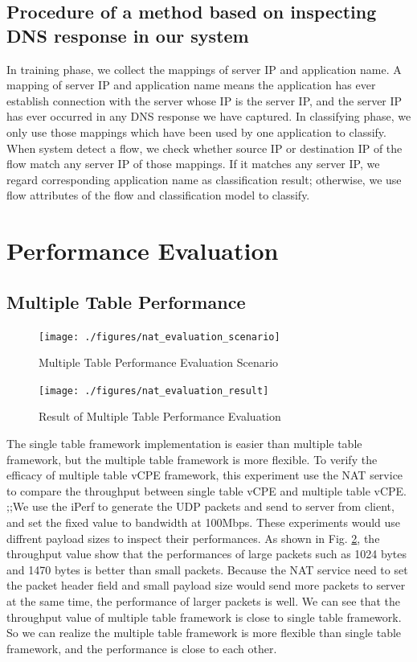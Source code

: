 \documentclass[journal]{IEEEtran}
\begin{document}
\subsection{Procedure of a method based on inspecting DNS response in our system}
In training phase, we collect the mappings of server IP and application name. A mapping of server IP and application name means the application has ever establish connection with the server whose IP is the server IP, and the server IP has ever occurred in any DNS response we have captured.
In classifying phase, we only use those mappings which have been used by one application to classify. When system detect a flow, we check whether source IP or destination IP of the flow match any server IP of those mappings. If it matches any server IP, we regard corresponding application name as classification result; otherwise, we use flow attributes of the flow and classification model to classify.



\section{Performance Evaluation}
\subsection{Multiple Table Performance}

\begin{figure}[!t]
\centering
\texttt{[image: ./figures/nat\_evaluation\_scenario]}
\caption{Multiple Table Performance Evaluation Scenario}
\label{fig:nat_evaluation}
\end{figure}

\begin{figure}[!t]
\centering
\texttt{[image: ./figures/nat\_evaluation\_result]}
\caption{Result of Multiple Table Performance Evaluation}
\label{fig:nat_evaluation_result}
\end{figure}

The single table framework implementation is easier than multiple table framework, but the multiple table framework is more flexible. To verify the efficacy of multiple table vCPE framework, this experiment use the NAT service to compare the throughput between single table vCPE and multiple table vCPE.
;;We use the iPerf  to generate the UDP packets and send to server from client, and set the fixed value to bandwidth at 100Mbps. These experiments would use diffrent payload sizes to inspect their performances.
As shown in Fig. \ref{fig:nat_evaluation_result}, the throughput value show that the performances of large packets such as 1024 bytes and 1470 bytes is better than small packets. Because the NAT service need to set the packet header field and small payload size would send more packets to server at the same time, the performance of larger packets is well. We can see that the throughput value of multiple table framework is close to single table framework. So we can realize the multiple table framework is more flexible than single table framework, and the performance is close to each other.
\end{document}
